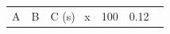\documentclass{article}
\begin{document}
\begin{tabular}{l S[table-format=4.0] S[table-format=2.2]}
A & {B} & {C (s)} \
x & 100 & 0.12 \
\end{tabular}
\end{document}
